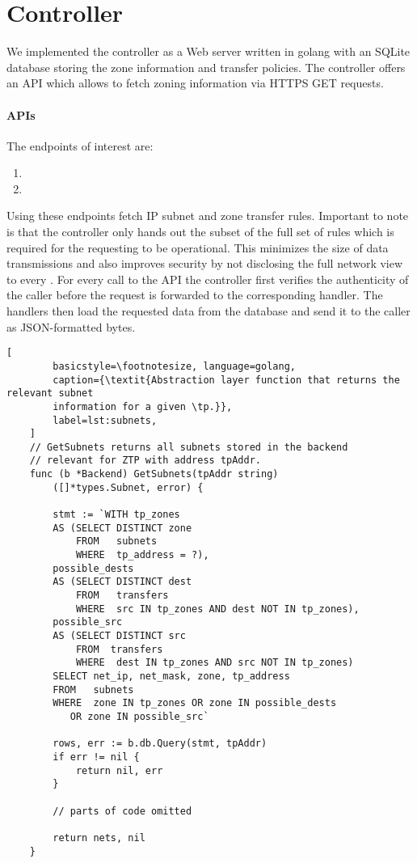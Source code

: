 \section{Controller}
\label{sec:controller}

We implemented the controller as a Web server written in golang with an SQLite database storing the
zone information and transfer policies. The controller offers an API which allows
\tps to fetch zoning information via HTTPS GET requests.

\paragraph{APIs}
The endpoints of interest are:

\begin{enumerate}
	\item {}
	\item {}
\end{enumerate}

Using these endpoints \tps fetch IP subnet and zone transfer rules. Important
to note is that the controller only hands out the subset of the full set of rules
which is required for the requesting \tp to be operational. This minimizes the size
of data transmissions and also improves security by not disclosing the full network
view to every \tp. For every call to the API the controller first verifies the
authenticity of the caller before the request is forwarded to the corresponding
handler. The handlers then load the requested data from the database and send it to
the caller as JSON-formatted bytes.

\begin{minipage}{\linewidth}
	\begin{lstlisting}[
		basicstyle=\footnotesize, language=golang,
		caption={\textit{Abstraction layer function that returns the relevant subnet
		information for a given \tp.}},
		label=lst:subnets,
	]
	// GetSubnets returns all subnets stored in the backend
	// relevant for ZTP with address tpAddr.
	func (b *Backend) GetSubnets(tpAddr string)
		([]*types.Subnet, error) {
	
		stmt := `WITH tp_zones
		AS (SELECT DISTINCT zone 
			FROM   subnets 
			WHERE  tp_address = ?), 
		possible_dests 
		AS (SELECT DISTINCT dest
			FROM   transfers 
			WHERE  src IN tp_zones AND dest NOT IN tp_zones), 
		possible_src 
		AS (SELECT DISTINCT src
			FROM  transfers 
			WHERE  dest IN tp_zones AND src NOT IN tp_zones) 
		SELECT net_ip, net_mask, zone, tp_address 
		FROM   subnets 
		WHERE  zone IN tp_zones OR zone IN possible_dests
		   OR zone IN possible_src`
	
		rows, err := b.db.Query(stmt, tpAddr)
		if err != nil {
			return nil, err
		}
	
		// parts of code omitted

		return nets, nil
	}
	\end{lstlisting}
\end{minipage}

